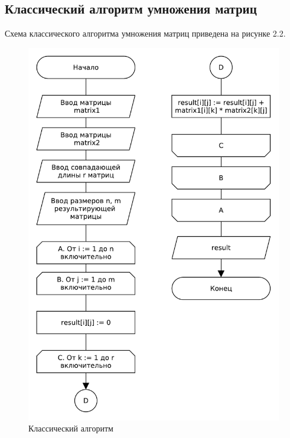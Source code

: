 \subsection{Классический алгоритм умножения матриц}
Схема классического алгоритма умножения матриц приведена на рисунке 2.2.
\begin{figure}[H]
    \centering
    \includegraphics[scale=0.75]{pdf/classicmul.pdf}
    \caption{Классический алгоритм}
\end{figure}

